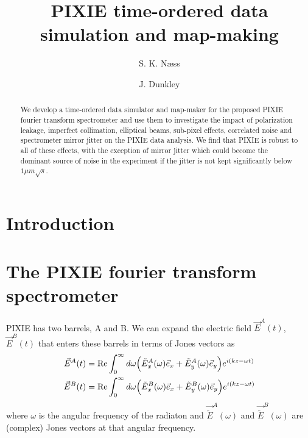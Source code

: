 \documentclass{article}
\title{PIXIE time-ordered data simulation and map-making}
\author[1,3]{S. K. Næss}
\author[2,3]{J. Dunkley}
\affil[1]{Center for Computational Astrophysics, Flatiron Institute}
\affil[2]{Princeton University}
\affil[3]{Oxford University}
\renewcommand{\Re}{\operatorname{Re}}
\newcommand{\J}{{\tilde E}}
\begin{document}
\maketitle
\begin{abstract}
	We develop a time-ordered data simulator and map-maker for the
	proposed PIXIE fourier transform spectrometer and use them to
	investigate the impact of polarization leakage, imperfect collimation,
	elliptical beams, sub-pixel effects, correlated noise and
	spectrometer mirror jitter on the PIXIE data analysis. We find
	that PIXIE is robust to all of these effects, with the exception
	of mirror jitter which could become the dominant source of noise
	in the experiment if the jitter is not kept significantly below
	$1\mu m\sqrt{s}$.
\end{abstract}

\section{Introduction}

\section{The PIXIE fourier transform spectrometer}
PIXIE has two barrels, A and B. We can expand the electric field $\vec E^A(t)$,
$\vec E^B(t)$ that enters these barrels in terms of Jones vectors as
\begin{align}
	\vec E^A(t) &= \Re \int_0^\infty d\omega \Big(\J^A_x(\omega)\vec e_x +
		\J^A_y(\omega)\vec e_y\Big) e^{i(kz-\omega t)} \notag \\
	\vec E^B(t) &= \Re \int_0^\infty d\omega \Big(\J^B_x(\omega)\vec e_x +
		\J^B_y(\omega)\vec e_y\Big) e^{i(kz-\omega t)}
\end{align}
where $\omega$ is the angular frequency of the radiaton and $\vec \J^A(\omega)$
and $\vec \J^B(\omega)$ are (complex) Jones vectors at that
angular frequency.
\end{document}
